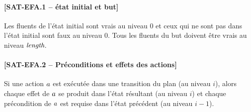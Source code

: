\paragraph*{[SAT-EFA.1 -- état initial et but]}
Les fluents de l'état initial sont vrais au niveau $0$ et ceux qui ne sont pas dans l'état initial sont faux au niveau $0$. Tous les fluents du but doivent être vrais au niveau $\textit{length}$.

\paragraph*{[SAT-EFA.2 -- Préconditions et effets des actions]} %
Si une action $a$ est exécutée dans une transition du plan (au niveau $i$), alors chaque effet de $a$ se produit dans l'état résultant (au niveau $i$) et chaque précondition de $a$ est requise dans l'état précédent (au niveau $i-1$).
